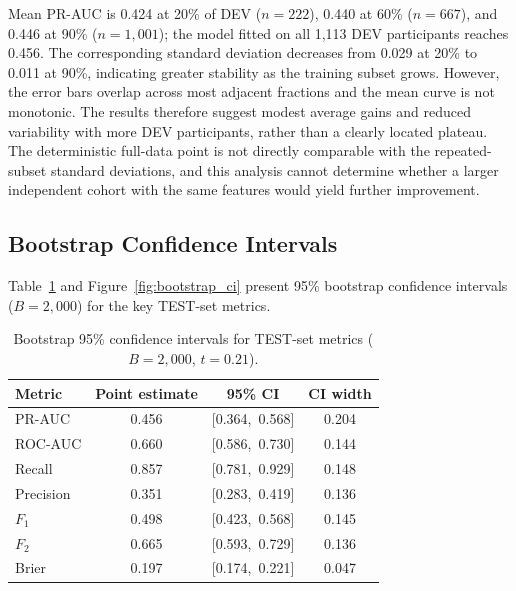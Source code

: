 \noindent Mean PR-AUC is 0.424 at 20\% of DEV ($n=222$), 0.440 at 60\% ($n=667$), and 0.446 at 90\% ($n=1{,}001$); the model fitted on all 1{,}113 DEV participants reaches 0.456.
The corresponding standard deviation decreases from 0.029 at 20\% to 0.011 at 90\%, indicating greater stability as the training subset grows.
However, the error bars overlap across most adjacent fractions and the mean curve is not monotonic.
The results therefore suggest modest average gains and reduced variability with more DEV participants, rather than a clearly located plateau.
The deterministic full-data point is not directly comparable with the repeated-subset standard deviations, and this analysis cannot determine whether a larger independent cohort with the same features would yield further improvement.

\subsection{Bootstrap Confidence Intervals}
\label{subsec:results_bootstrap}

Table~\ref{tab:bootstrap_ci} and Figure~\ref{fig:bootstrap_ci} present 95\% bootstrap confidence intervals ($B\!=\!2{,}000$) for the key TEST-set metrics.

\begin{table}[ht!]
\centering
\caption[Bootstrap 95\% confidence intervals, TEST set]{Bootstrap 95\% confidence intervals for TEST-set metrics ($B\!=\!2{,}000$, $t\!=\!0.21$).}
\label{tab:bootstrap_ci}
\small
\begin{tabular}{l c c c}
\toprule
\textbf{Metric} & \textbf{Point estimate} & \textbf{95\% CI} & \textbf{CI width} \\
\midrule
PR-AUC    & 0.456 & [0.364,~0.568] & 0.204 \\
ROC-AUC   & 0.660 & [0.586,~0.730] & 0.144 \\
Recall    & 0.857 & [0.781,~0.929] & 0.148 \\
Precision & 0.351 & [0.283,~0.419] & 0.136 \\
$F_1$     & 0.498 & [0.423,~0.568] & 0.145 \\
$F_2$     & 0.665 & [0.593,~0.729] & 0.136 \\
Brier     & 0.197 & [0.174,~0.221] & 0.047 \\
\bottomrule
\end{tabular}
\end{table}

